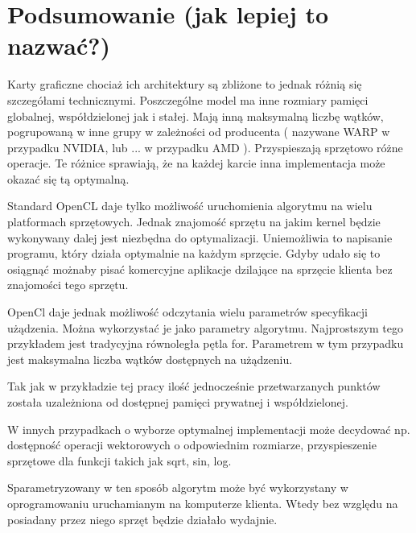 
\section{Podsumowanie (jak lepiej to nazwać?)}

Karty graficzne chociaż ich architektury są zbliżone to jednak różnią się szczegółami technicznymi. Poszczególne model ma inne rozmiary pamięci globalnej, współdzielonej jak i stałej.
Mają inną maksymalną liczbę wątków, pogrupowaną w inne grupy w zależności od producenta ( nazywane WARP w przypadku NVIDIA, lub ... w przypadku AMD ). Przyspieszają sprzętowo różne operacje. Te różnice sprawiają, że na każdej karcie inna implementacja może okazać się tą optymalną. \linebreak


Standard OpenCL daje tylko możliwość uruchomienia algorytmu na wielu platformach sprzętowych. Jednak znajomość sprzętu na jakim kernel będzie wykonywany dalej jest niezbędna do optymalizacji. 
Uniemożliwia to napisanie programu, który działa optymalnie na każdym sprzęcie. Gdyby udało się to osiągnąć możnaby pisać komercyjne aplikacje dzilające na sprzęcie klienta bez znajomości tego sprzętu. \linebreak




OpenCl daje jednak możliwość odczytania wielu parametrów specyfikacji użądzenia. Można wykorzystać je jako parametry algorytmu. Najprostszym tego przykładem jest tradycyjna równoległa pętla for. Parametrem w tym przypadku jest maksymalna liczba wątków dostępnych na użądzeniu.
\linebreak



Tak jak w przykładzie tej pracy ilość jednocześnie przetwarzanych punktów została uzależniona od dostępnej pamięci prywatnej i współdzielonej.
\linebreak

W innych przypadkach o wyborze optymalnej implementacji może decydować np. dostępność operacji wektorowych o odpowiednim rozmiarze, przyspieszenie sprzętowe dla funkcji takich jak sqrt, sin, log.

Sparametryzowany w ten sposób algorytm może być wykorzystany w oprogramowaniu uruchamianym na komputerze klienta. Wtedy bez względu na posiadany przez niego sprzęt będzie działało wydajnie.
\linebreak



